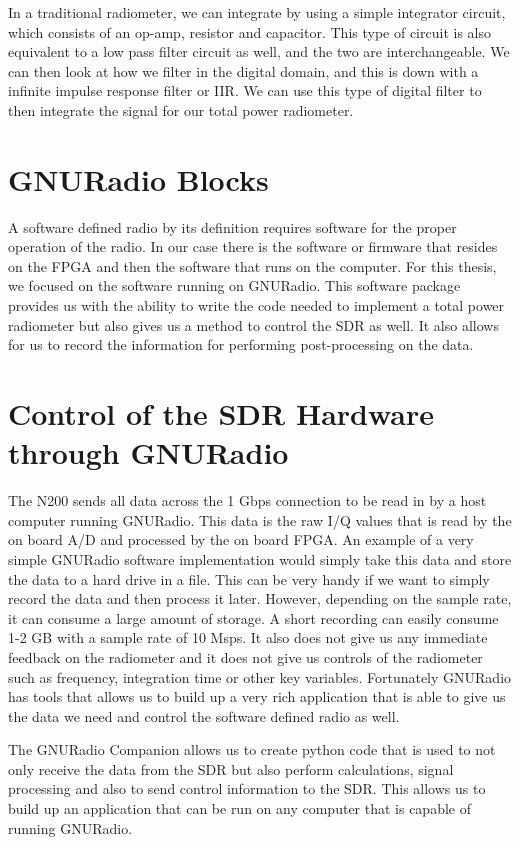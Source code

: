 In a traditional radiometer, we can integrate by using a simple integrator circuit, which consists of an op-amp, resistor and capacitor.  This type of circuit is also equivalent to a low pass filter circuit as well, and the two are interchangeable.  We can then look at how we filter in the digital domain, and this is down with a infinite impulse response filter or IIR.  We can use this type of digital filter to then integrate the signal for our total power radiometer. 

\section{GNURadio Blocks}
A software defined radio by its definition requires software for the proper operation of the radio.  In our case there is the software or firmware that resides on the FPGA and then the software that runs on the computer.  For this thesis, we focused on the software running on GNURadio.  This software package provides us with the ability to write the code needed to implement a total power radiometer but also gives us a method to control the SDR as well.  It also allows for us to record the information for performing post-processing on the data.

\section{Control of the SDR Hardware through GNURadio}
The N200 sends all data across the 1 Gbps connection to be read in by a host computer running GNURadio.  This data is the raw I/Q values that is read by the on board A/D and processed by the on board FPGA.  An example of a very simple GNURadio software implementation would simply take this data and store the data to a hard drive in a file.  This can be very handy if we want to simply record the data and then process it later.  However, depending on the sample rate, it can consume a large amount of storage.  A short recording can easily consume 1-2 GB with a sample rate of 10 Msps.  It also does not give us any immediate feedback on the radiometer and it does not give us controls of the radiometer such as frequency, integration time or other key variables.  Fortunately GNURadio has tools that allows us to build up a very rich application that is able to give us the data we need and control the software defined radio as well.

The GNURadio Companion allows us to create python code that is used to not only receive the data from the SDR but also perform calculations, signal processing and also to send control information to the SDR.  This allows us to build up an application that can be run on any computer that is capable of running GNURadio.  

